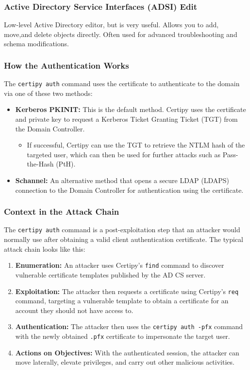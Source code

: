 \subsubsection{Active Directory Service Interfaces (ADSI) Edit}
Low-level Active Directory editor, but is very useful. Allows you to add, move,and delete objects directly. Often used for advanced troubleshooting and schema modifications.



 
 








\subsubsection{How the Authentication Works}
The \verb|certipy auth| command uses the certificate to authenticate to the domain via one of these two methods:
\begin{itemize}
    \item \textbf{Kerberos PKINIT:} This is the default method. Certipy uses the certificate and private key to request a Kerberos Ticket Granting Ticket (TGT) from the Domain Controller.
    \begin{itemize}
        \item If successful, Certipy can use the TGT to retrieve the NTLM hash of the targeted user, which can then be used for further attacks such as Pass-the-Hash (PtH).
    \end{itemize}
\item \textbf{Schannel:} An alternative method that opens a secure LDAP (LDAPS) connection to the Domain Controller for authentication using the certificate.
\end{itemize}

\subsubsection{Context in the Attack Chain}
The \texttt{certipy auth} command is a post-exploitation step that an attacker would normally use after obtaining a valid client authentication certificate. The typical attack chain looks like this:
\begin{enumerate}
    \item \textbf{Enumeration:} An attacker uses Certipy's \texttt{find} command to discover vulnerable certificate templates published by the AD CS server.
    \item \textbf{Exploitation:} The attacker then requests a certificate using Certipy's \texttt{req} command, targeting a vulnerable template to obtain a certificate for an account they should not have access to.
    \item \textbf{Authentication:} The attacker then uses the \texttt{certipy auth -pfx} command with the newly obtained \texttt{.pfx} certificate to impersonate the target user.
    \item \textbf{Actions on Objectives:} With the authenticated session, the attacker can move laterally, elevate privileges, and carry out other malicious activities.
\end{enumerate}

